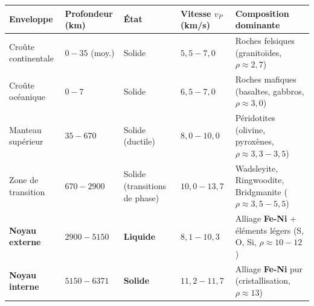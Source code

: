 \documentclass[11pt]{article}
\begin{document}
\begin{propriete}
\begin{center}
\begin{tabularx}{\linewidth}{|l|X|X|X|X|}\hline
\rowcolor{popblueL}
\textbf{Enveloppe} & \textbf{Profondeur (km)} & \textbf{État} & \textbf{Vitesse $v_P$ (km/s)} & \textbf{Composition dominante} \\ \hline
Croûte continentale & $0 - 35$ (moy.) & Solide & $5,5 - 7,0$ & Roches felsiques (granitoïdes, $\rho \approx 2,7$) \\ \hline
Croûte océanique & $0 - 7$ & Solide & $6,5 - 7,0$ & Roches mafiques (basaltes, gabbros, $\rho \approx 3,0$) \\ \hline
Manteau supérieur & $35 - 670$ & Solide (ductile) & $8,0 - 10,0$ & Péridotites (olivine, pyroxènes, $\rho \approx 3,3-3,5$) \\ \hline
Zone de transition & $670 - 2900$ & Solide (transitions de phase) & $10,0 - 13,7$ & Wadsleyite, Ringwoodite, Bridgmanite ($\rho \approx 3,5-5,5$) \\ \hline
\textbf{Noyau externe} & $2900 - 5150$ & \textbf{Liquide} & $8,1 - 10,3$ & Alliage \textbf{Fe-Ni} + éléments légers (S, O, Si, $\rho \approx 10-12$) \\ \hline
\textbf{Noyau interne} & $5150 - 6371$ & \textbf{Solide} & $11,2 - 11,7$ & Alliage \textbf{Fe-Ni} pur (cristallisation, $\rho \approx 13$) \\ \hline
\end{tabularx}
\end{center}
\end{propriete}
\end{document}
